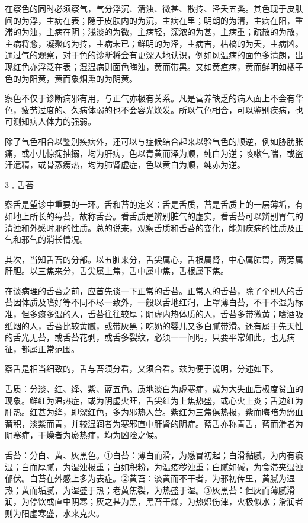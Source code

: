 \documentclass[12pt,UTF8]{ctexbook}
\begin{document}
在察色的同时必须察气，气分浮沉、清浊、微甚、散抟、泽夭五类。其色现于皮肤间的为浮，主病在表；隐于皮肤内的为沉，主病在里；明朗的为清，主病在阳，重滞的为浊，主病在阴；浅淡的为微，主病轻，深浓的为甚，主病重；疏散的为散，主病将愈，凝聚的为抟，主病未已；鲜明的为泽，主病吉，枯槁的为夭，主病凶。通过气的观察，对于色的诊断将会有更深入地认识，例如风温病的面色多清朗，出现红色亦浮泛在表；湿温病则面色晦浊，黄而带黑。又如黄疸病，黄而鲜明如橘子色的为阳黄，黄而象烟熏的为阴黄。

察色不仅于诊断病邪有用，与正气亦极有关系。凡是营养缺乏的病人面上不会有华色，疲劳过度的、久病体弱的也不会容光焕发。所以气色相合，可以鉴别疾病，也可测知病人体力的强弱。

除了气色相合以鉴别疾病外，还可以与症候结合起来以验气色的顺逆，例如胁肋胀痛，或小儿惊痫抽搦，均为肝病，色以青黄而泽为顺，纯白为逆；咳嗽气喘，或盗汗遗精，或骨蒸痨热，均为肺肾虚症，色以黄白为顺，纯赤为逆。

3﹒舌苔

察舌是望诊中重要的一环。舌和苔的定义：舌是舌质，苔是舌质上的一层薄垢，有如地上所长的莓苔，故称舌苔。看舌质是辨别脏气的虚实，看舌苔可以辨别胃气的清浊和外感时邪的性质。总的说来，观察舌质和舌苔的变化，能知疾病的性质及正气和邪气的消长情况。

其次，当知舌苔的分部。以五脏来分，舌尖属心，舌根属肾，中心属肺胃，两旁属肝胆。以三焦来分，舌尖属上焦，舌中属中焦，舌根属下焦。

在谈病理的舌苔之前，应首先谈一下正常的舌苔。正常人的舌苔，除了个别人的舌苔因体质及嗜好等不同不尽一致外，一般以舌地红润，上罩薄白苔，不干不湿为标准，但多痰多湿的人，舌苔往往较厚；阴虚内热体质的人，舌苔多带微黄；嗜酒吸纸烟的人，舌苔比较黄腻，或带灰黑；吃奶的婴儿又多白腻带滑。还有属于先天性的舌光无苔，或舌苔花剥，或舌多裂纹，必须一一问明，只要平常如此，也无病征，都属正常范围。

察舌是相当细致的，舌与苔须分看，又须合看。兹为便于说明，分述如下。

舌质：分淡、红、绛、紫、蓝五色。质地淡白为虚寒症，或为大失血后极度贫血的现象。鲜红为温热症，或为阴虚火旺，舌尖红为上焦热盛，或心火上炎；舌边红为肝热。红甚为绛，即深红色，多为邪热入营。紫红为三焦俱热极，紫而晦暗为瘀血蓄积，淡紫而青，并较湿润者为寒邪直中肝肾的阴症。蓝舌亦称青舌，蓝而滑者为阴寒症，干燥者为瘀热症，均为凶险之候。

舌苔：分白、黄、灰黑色。①白苔：薄白而滑，为感冒初起；白滑黏腻，为内有痰湿；白而厚腻，为湿浊极重；白如积粉，为温疫秽浊重；白腻如碱，为食滞夹湿浊郁伏。白苔在外感上多为表症。②黄苔：淡黄而不干者，为邪初传里，黄腻为湿热；黄而垢腻，为湿盛于热；老黄焦裂，为热盛于湿。③灰黑苔：但灰而薄腻滑润，为停饮或直中阴寒；灰之甚为黑，黑苔干燥，为热炽伤津，火极似水；滑润者则为阳虚寒盛，水来克火。
\end{document}
